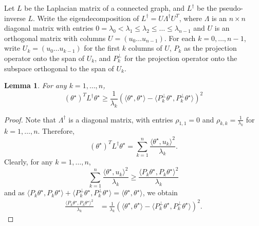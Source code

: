 \documentclass{article}
\newcommand{\dotp}[2]{\langle #1, #2 \rangle}
\newcommand{\1}{\mathbb{I}}
\newcommand{\Linv}{L^{\dagger}}
\newcommand{\thetast}{\theta^{\star}}
\theoremstyle{alden}
\theoremstyle{aldenthm}
\newtheorem{lemma}{Lemma}
\theoremstyle{definition}
\theoremstyle{remark}
\begin{document}
Let $L$ be the Laplacian matrix of a connected graph, and $\Linv$ be the pseudo-inverse $L$. Write the eigendecomposition of $\Linv = U\Lambda^{\dagger}U^{T}$, where $\Lambda$ is an $n \times n$ diagonal matrix with entries $0 = \lambda_0 < \lambda_1 \leq \lambda_2 \leq \ldots \leq \lambda_{n-1}$ and $U$ is an orthogonal matrix with columns $U =\left(u_0 \ldots u_{n-1}\right)$. For each $k = 0, \ldots, n - 1$, write $U_{k} = (u_0 \ldots u_{k-1})$ for the first $k$ columns of $U$, $P_k$ as the projection operator onto the span of $U_k$, and $P_k^{\perp}$ for the projection operator onto the subspace orthogonal to the span of $U_k$.
\begin{lemma}
	\label{lem: lin_alg_1}
	For any $k = 1, \ldots, n$, 
	\begin{equation*}
	(\thetast)^T \Linv \thetast \geq \frac{1}{\lambda_k}\left(\dotp{\thetast}{\thetast} - \dotp{P_k^{\perp} \thetast}{P_k^{\perp}\thetast}\right)^2
	\end{equation*}
\end{lemma}
\begin{proof}
	Note that $\Lambda^{\dagger}$ is a diagonal matrix, with entries $\rho_{1,1} = 0$ and $\rho_{k,k} = \frac{1}{\lambda_k}$ for $k = 1, \ldots, n$. Therefore,
	\begin{equation*}
	(\thetast)^T \Linv \thetast = \sum_{k = 1}^{n} \frac{\dotp{\thetast}{u_k}^2}{\lambda_k}.
	\end{equation*}
	Clearly, for any $k = 1, \ldots, n$,
	\begin{equation*}
	\sum_{k = 1}^{n} \frac{\dotp{\thetast}{u_k}^2}{\lambda_k} \geq \frac{\dotp{P_k \thetast}{P_k \thetast}^2}{\lambda_k}
	\end{equation*}
	and as $\dotp{P_k \thetast}{P_k \thetast} + \dotp{P_k^{\perp} \thetast}{P_k^{\perp} \thetast} = \dotp{\thetast}{\thetast}$, we obtain
	\begin{align*}
	\frac{\dotp{P_k \thetast}{P_k \thetast}^2}{\lambda_k} & =  \frac{1}{\lambda_k}\left(\dotp{\thetast}{\thetast} - \dotp{P_k^{\perp} \thetast}{P_k^{\perp}\thetast}\right)^2.
	\end{align*}
\end{proof}
\end{document}
